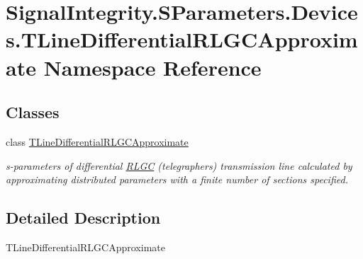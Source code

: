 \hypertarget{namespaceSignalIntegrity_1_1SParameters_1_1Devices_1_1TLineDifferentialRLGCApproximate}{}\section{Signal\+Integrity.\+S\+Parameters.\+Devices.\+T\+Line\+Differential\+R\+L\+G\+C\+Approximate Namespace Reference}
\label{namespaceSignalIntegrity_1_1SParameters_1_1Devices_1_1TLineDifferentialRLGCApproximate}
\subsection*{Classes}
\begin{DoxyCompactItemize}
\item 
class \hyperlink{classSignalIntegrity_1_1SParameters_1_1Devices_1_1TLineDifferentialRLGCApproximate_1_1TLineDifferentialRLGCApproximate}{T\+Line\+Differential\+R\+L\+G\+C\+Approximate}
\begin{DoxyCompactList}\small\item\em s-\/parameters of differential \hyperlink{namespaceSignalIntegrity_1_1SParameters_1_1RLGC}{R\+L\+GC} (telegrapher\textquotesingle{}s) transmission line calculated by approximating distributed parameters with a finite number of sections specified. \end{DoxyCompactList}\end{DoxyCompactItemize}


\subsection{Detailed Description}
\begin{DoxyVerb}TLineDifferentialRLGCApproximate\end{DoxyVerb}
 